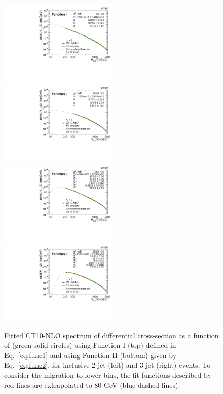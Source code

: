 \begin{figure}[ht]
 \begin{center}
 \hspace*{-5mm}\includegraphics[width=0.51\textwidth]{Plots_HT_2_150/Extrapolate_Theory_2_HT_2_150_funcI.pdf}%
 ~~\includegraphics[width=0.51\textwidth]{Plots_HT_2_150/Extrapolate_Theory_3_HT_2_150_funcI.pdf}\\
 \vspace{5mm}
 \hspace*{-5mm}\includegraphics[width=0.51\textwidth]{Plots_HT_2_150/Extrapolate_Theory_2_HT_2_150_funcII.pdf}%
 ~~\includegraphics[width=0.51\textwidth]{Plots_HT_2_150/Extrapolate_Theory_3_HT_2_150_funcII.pdf}
 \caption[Fitted CT10-NLO spectrum of differential cross-section as a function of \httwo.]{Fitted CT10-NLO spectrum of differential cross-section as a function of \httwo (green solid circles) using Function I (top) defined in Eq.~\ref{eq:func1} and using Function II (bottom) given by Eq.~\ref{eq:func2}, for inclusive 2-jet (left) and 3-jet (right) events. To consider the migration to lower \httwo bins, the fit functions described by red lines are extrapolated to 80 GeV (blue dashed lines).}
 \label{fig:fit}
 \end{center}
\end{figure}

